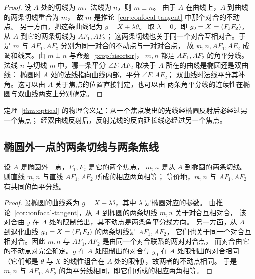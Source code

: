 \begin{proof}
设 $A$ 处的切线为 $m$，法线为 $n$，则 $m\perp n$。
由于 $A$ 在曲线上，$A$ 到曲线的两条切线重合为 $m$，
故 $m$ 是推论~\ref{cor:confocal-tangent} 中那个对合的不动点。
另一方面，把这条曲线记为 $g=X+\lambda\theta$。
取 $\lambda=0$，即 $g_0=X=(F_1F_2)$，从 $A$ 到它的两条切线为 $AF_1,AF_2$；
这两条切线也关于同一个对合互相对合。于是 $m$ 与 $AF_1,AF_2$ 分别为同一对合的不动点与一对对合点，
故 $m,n,AF_1,AF_2$ 成调和线束。由 $m\perp n$ 与命题~\ref{prop:bisector}，
$m,n$ 都是 $AF_1,AF_2$ 的角平分线。
法线 $n$ 与切线 $m$ 中，哪一条平分 $\angle F_1AF_2$ 取决于 $A$ 所在的曲线是椭圆还是双曲线：
椭圆时 $A$ 处的法线指向曲线内部，平分 $\angle F_1AF_2$；
双曲线时法线平分其补角。这可以由 $A$ 关于焦点的位置直接判定，也可以由
两条角平分线的连续性在椭圆与双曲线两支上分别确定。
\end{proof}

\begin{remark}
定理~\ref{thm:optical} 的物理含义是：从一个焦点发出的光线经椭圆反射后必经过另一个焦点；
经双曲线反射后，反射光线的反向延长线必经过另一个焦点。
\end{remark}

\subsection{椭圆外一点的两条切线与两条焦线}

\begin{proposition}[外点的等角性质]\label{prop:external-point}
设 $A$ 是椭圆外一点，$F_1,F_2$ 是它的两个焦点，
$m,n$ 是从 $A$ 到椭圆的两条切线。则直线 $m,n$ 与直线 $AF_1,AF_2$ 所成的相应两角相等；
等价地，$m,n$ 与 $AF_1,AF_2$ 有共同的角平分线。
\end{proposition}

\begin{proof}
设椭圆的曲线系为 $g=X+\lambda\theta$，其中 $\lambda$ 是椭圆对应的参数。
由推论~\ref{cor:confocal-tangent}，从 $A$ 到椭圆的两条切线 $m,n$ 关于对合互相对合，
该对合由 $g$ 在 $A$ 处的限制给出，其不动点是两条角平分线方向。
另一方面，从 $A$ 到退化曲线 $g_0=X=(F_1F_2)$ 的两条切线是 $AF_1,AF_2$，
它们也关于同一个对合互相对合。因此 $m,n$ 与 $AF_1,AF_2$ 是由同一个对合联系的两对对合点，
而对合由它的不动点对完全确定。$g$ 在 $A$ 处限制出的对合与 $g_0$ 在 $A$ 处限制出的对合相同
（它们都是 $\theta$ 与 $X$ 的线性组合在 $A$ 处的限制），故两者的不动点相同。
于是 $m,n$ 与 $AF_1,AF_2$ 的角平分线相同，即它们所成的相应两角相等。
\end{proof}

